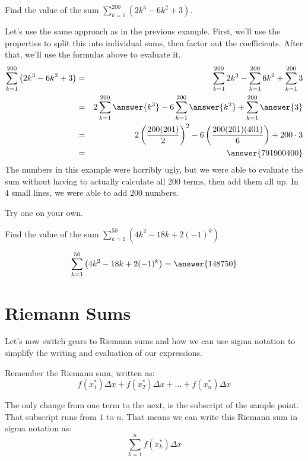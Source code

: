 \documentclass{ximera}
\begin{document}
\begin{example}
	Find the value of the sum $\displaystyle \sum_{k=1}^{200} \left(2k^3-6k^2+3\right)$.
	\begin{explanation}
		Let's use the same approach as in the previous example.  First, we'll use the properties to split this into individual sums, then factor out the coefficients.  
		After that, we'll use the formulas above to evaluate it.
		\begin{eqnarray*}
			\sum_{k=1}^{200} \left(2k^3-6k^2+3\right) &=& \sum_{k=1}^{200} 2k^3 - \sum_{k=1}^{200} 6k^2 + \sum_{k=1}^{200}3\\
				&=& 2 \sum_{k=1}^{200} \answer{k^3} - 6 \sum_{k=1}^{200} \answer{k^2} + \sum_{k=1}^{200}\answer{3}\\
				&=& 2 \left( \frac{200(201)}{2}\right)^2 - 6 \left( \frac{200(201)(401)}{6}\right) + 200 \cdot 3\\
				&=& \answer{791900400}
		\end{eqnarray*}
	The numbers in this example were horribly ugly, but we were able to evaluate the sum without having to actually calculate all 200 terms, then add them all up.
	In 4 small lines, we were able to add 200 numbers.
	
	\end{explanation}
\end{example}

 

Try one on your own.
\begin{problem}
	Find the value of the sum $\displaystyle \sum_{k=1}^{50} \left( 4k^2-18k + 2(-1)^k \right)$
	
	\[ \sum_{k=1}^{50} \left( 4k^2 - 18k + 2(-1)^k \right) = \answer{148750} \]
\end{problem}

\section{Riemann Sums}
Let's now switch gears to Riemann sums and how we can use sigma notation to simplify the writing and evaluation of our expressions.

  Remember the Riemann sum, written as:
\[ f(x_1^*) \Delta x + f(x_2^*) \Delta x + \ldots + f(x_n^*) \Delta x\]

The only change from one term to the next, is the subscript of the sample point.
That subscript runs from $1$ to $n$.  That means we can write this Riemann sum
in sigma notation as:
\[ \sum_{k=1}^n f(x_k^*) \Delta x \]
\end{document}
